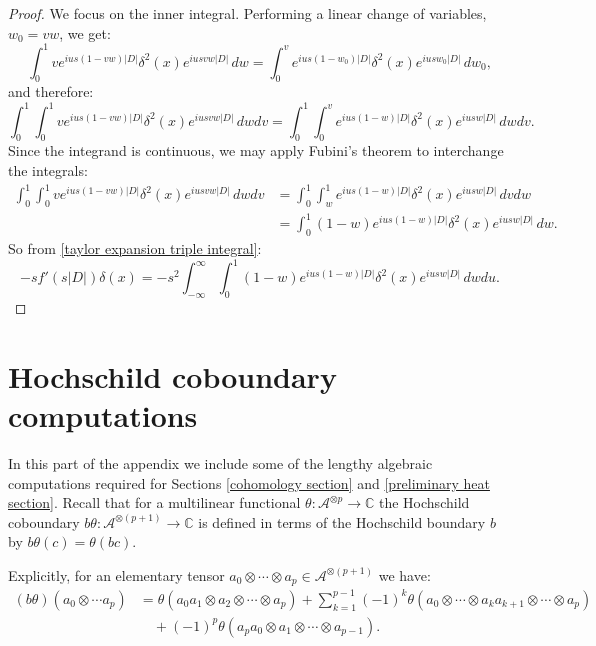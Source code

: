 \begin{proof}
        We focus on the inner integral. Performing a linear change of variables, $w_0 = vw$, we get:
        \begin{equation*}
            \int_0^1 ve^{ius(1-vw)|D|}\delta^2(x)e^{iusvw|D|}\,dw = \int_0^v e^{ius(1-w_0)|D|}\delta^2(x)e^{iusw_0|D|}\,dw_0,
        \end{equation*}
        and therefore:
        \begin{equation*}
            \int_0^1 \int_0^1 ve^{ius(1-vw)|D|}\delta^2(x)e^{iusvw|D|}\,dwdv = \int_0^1 \int_{0}^v e^{ius(1-w)|D|}\delta^2(x)e^{iusw|D|}\,dwdv.
        \end{equation*}
        Since the integrand is continuous, we may apply Fubini's theorem to interchange the integrals: 
        \begin{align*}
            \int_0^1 \int_0^1 ve^{ius(1-vw)|D|}\delta^2(x)e^{iusvw|D|}\,dwdv &= \int_0^1 \int_{w}^1 e^{ius(1-w)|D|}\delta^2(x)e^{iusw|D|}\,dvdw\\
                                                                             &= \int_0^1 (1-w)e^{ius(1-w)|D|}\delta^2(x)e^{iusw|D|}\,dw.
        \end{align*}         
        So from \eqref{taylor expansion triple integral}:
        \begin{equation*}
            [f(s|D|),x]-sf'(s|D|)\delta(x) = -s^2\int_{-\infty}^\infty \int_0^1 (1-w)e^{ius(1-w)|D|}\delta^2(x)e^{iusw|D|}\,dwdu.
        \end{equation*}
    \end{proof}

\section{Hochschild coboundary computations}\label{coboundary app}

    In this part of the appendix we include some of the lengthy algebraic computations required for Sections \ref{cohomology section} and \ref{preliminary heat section}.    
    Recall that for a multilinear functional $\theta:\mathcal{A}^{\otimes p}\to\mathbb{C}$ the Hochschild coboundary $b\theta:\mathcal{A}^{\otimes (p+1)}\to\mathbb{C}$ is defined in terms of the Hochschild boundary $b$ by $b\theta(c) = \theta(bc)$.
    
    Explicitly, for an elementary tensor $a_0\otimes\cdots \otimes a_p \in \mathcal{A}^{\otimes (p+1)}$ we have:
    \begin{align*}
        (b\theta)(a_0\otimes\cdots a_p) &= \theta(a_0a_1\otimes a_2\otimes\cdots \otimes a_p)+\sum_{k=1}^{p-1} (-1)^k \theta(a_0\otimes\cdots \otimes a_ka_{k+1}\otimes\cdots\otimes a_p)\\
                                        &\quad + (-1)^p\theta(a_pa_0\otimes a_1\otimes\cdots\otimes a_{p-1}).
    \end{align*}

